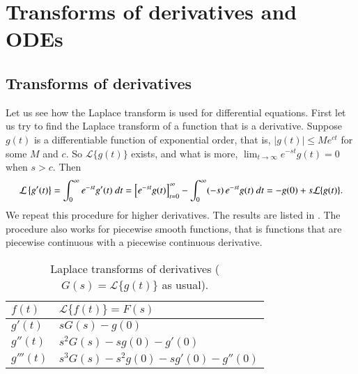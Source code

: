 
\sectionnewpage
\section{Transforms of derivatives and ODEs}
\label{transformsofders:section}


\subsection{Transforms of derivatives}

Let us see how the Laplace transform is used for differential equations.
First let us try to find the Laplace transform of a function that is a
derivative.  Suppose $g(t)$ is a differentiable function
of exponential order, that is, $\lvert g(t) \rvert \leq M e^{ct}$ for some
$M$ and $c$.  So $\mathcal{L} \{ g(t) \}$ exists, and what is more,
$\lim_{t\to\infty} e^{-st}g(t) = 0$ when $s > c$.  Then
\begin{equation*}
\mathcal{L} \left\{ g'(t) \right\}
=
\int_0^\infty
e^{-st}
g'(t) ~dt
=
\Bigl[e^{-st} g(t) \Bigr]_{t=0}^\infty
-
\int_0^\infty
(-s)\,
e^{-st}
g(t) ~dt
=
-g(0) + s \mathcal{L} \{ g(t) \} .
\end{equation*}
We repeat this procedure for higher derivatives.
The results are
listed in .  The procedure also works for piecewise
smooth functions, that is functions that are piecewise continuous with a
piecewise continuous derivative.

\begin{table}[h!t]
\capstart
\begin{center}
\begin{tabular}{@{}ll@{}}
\toprule
$f(t)$ & $\mathcal{L} \{ f(t) \} = F(s)$ \\
\midrule
$g'(t)$ & $sG(s)-g(0)$ \\[3pt]
$g''(t)$ & $s^2G(s)-sg(0)-g'(0)$ \\[3pt]
$g'''(t)$ & $s^3G(s)-s^2g(0)-sg'(0)-g''(0)$ \\
\bottomrule
\end{tabular}
\end{center}
\caption{Laplace transforms of derivatives ($G(s) = \mathcal{L} \{ g(t) \}$
as usual).\label{ltd:table}}
\end{table}

